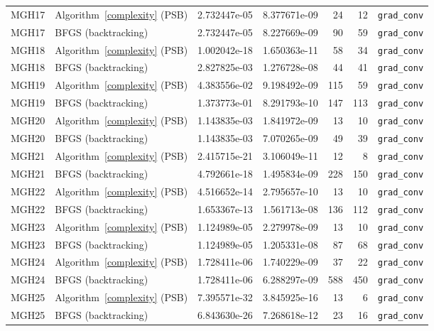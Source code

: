 \documentclass[11pt]{article}
\begin{document}
{\begin{longtable}{l l S[table-format=1.3e2] S[table-format=1.3e2] r r >{\raggedright\arraybackslash}p{2.2cm}}
\midrule
MGH17 & Algorithm~\ref{complexity} (PSB) & 2.732447e-05 & 8.377671e-09 & 24 & 12 & \texttt{grad\_conv} \\
MGH17 & BFGS (backtracking) & 2.732447e-05 & 8.227669e-09 & 90 & 59 & \texttt{grad\_conv} \\
\midrule
MGH18 & Algorithm~\ref{complexity} (PSB) & 1.002042e-18 & 1.650363e-11 & 58 & 34 & \texttt{grad\_conv} \\
MGH18 & BFGS (backtracking) & 2.827825e-03 & 1.276728e-08 & 44 & 41 & \texttt{grad\_conv} \\
\midrule
MGH19 & Algorithm~\ref{complexity} (PSB) & 4.383556e-02 & 9.198492e-09 & 115 & 59 & \texttt{grad\_conv} \\
MGH19 & BFGS (backtracking) & 1.373773e-01 & 8.291793e-10 & 147 & 113 & \texttt{grad\_conv} \\
\midrule
MGH20 & Algorithm~\ref{complexity} (PSB) & 1.143835e-03 & 1.841972e-09 & 13 & 10 & \texttt{grad\_conv} \\
MGH20 & BFGS (backtracking) & 1.143835e-03 & 7.070265e-09 & 49 & 39 & \texttt{grad\_conv} \\
\midrule
MGH21 & Algorithm~\ref{complexity} (PSB) & 2.415715e-21 & 3.106049e-11 & 12 & 8 & \texttt{grad\_conv} \\
MGH21 & BFGS (backtracking) & 4.792661e-18 & 1.495834e-09 & 228 & 150 & \texttt{grad\_conv} \\
\midrule
MGH22 & Algorithm~\ref{complexity} (PSB) & 4.516652e-14 & 2.795657e-10 & 13 & 10 & \texttt{grad\_conv} \\
MGH22 & BFGS (backtracking) & 1.653367e-13 & 1.561713e-08 & 136 & 112 & \texttt{grad\_conv} \\
\midrule
MGH23 & Algorithm~\ref{complexity} (PSB) & 1.124989e-05 & 2.279978e-09 & 13 & 10 & \texttt{grad\_conv} \\
MGH23 & BFGS (backtracking) & 1.124989e-05 & 1.205331e-08 & 87 & 68 & \texttt{grad\_conv} \\
\midrule
MGH24 & Algorithm~\ref{complexity} (PSB) & 1.728411e-06 & 1.740229e-09 & 37 & 22 & \texttt{grad\_conv} \\
MGH24 & BFGS (backtracking) & 1.728411e-06 & 6.288297e-09 & 588 & 450 & \texttt{grad\_conv} \\
\midrule
MGH25 & Algorithm~\ref{complexity} (PSB) & 7.395571e-32 & 3.845925e-16 & 13 & 6 & \texttt{grad\_conv} \\
MGH25 & BFGS (backtracking) & 6.843630e-26 & 7.268618e-12 & 23 & 16 & \texttt{grad\_conv} \\
\midrule

\end{longtable}}
\end{document}
